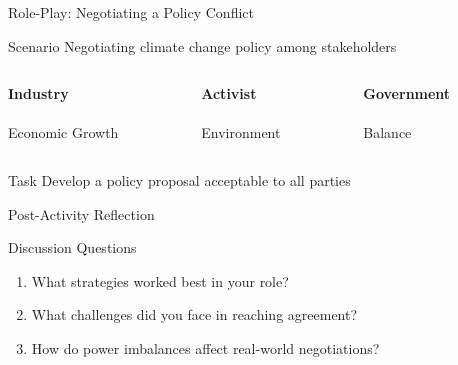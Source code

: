 \documentclass[10pt]{beamer}
\begin{document}
\begin{frame}{Role-Play: Negotiating a Policy Conflict}
    \begin{block}{Scenario}
        Negotiating climate change policy among stakeholders
    \end{block}
    
    \begin{columns}[T]
        \begin{column}{0.33\textwidth}
            \centering
            \textbf{Industry}\\
            \\
            Economic Growth
        \end{column}
        \begin{column}{0.33\textwidth}
            \centering
            \textbf{Activist}\\
            \\
            Environment
        \end{column}
        \begin{column}{0.33\textwidth}
            \centering
            \textbf{Government}\\
            \\
            Balance
        \end{column}
    \end{columns}
    
    \begin{alertblock}{Task}
        Develop a policy proposal acceptable to all parties
    \end{alertblock}
\end{frame}

\begin{frame}{Post-Activity Reflection}
    \begin{exampleblock}{Discussion Questions}
        \begin{enumerate}
            \item What strategies worked best in your role?
            \item What challenges did you face in reaching agreement?
            \item How do power imbalances affect real-world negotiations?
        \end{enumerate}
    \end{exampleblock}
    
    \begin{center}
    \end{center}
\end{frame}
\end{document}
